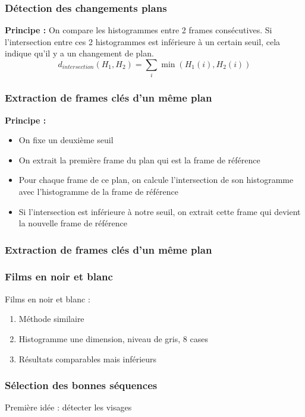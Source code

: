  \begin{frame}
 \frametitle{Détection des changements plans}
 
 \textbf{Principe :} On compare les histogrammes entre 2 frames consécutives. Si l'intersection entre ces 2 histogrammes est inférieure à un certain seuil, cela indique qu'il y a un changement de plan. \\
 \[d_{intersection}(H_{1},H_{2}) = \sum_{i} \min(H_{1}(i),H_{2}(i))\]
 
 \end{frame}
 
 
 \begin{frame}
 \frametitle{Extraction de frames clés d'un même plan}
 \textbf{Principe :}
\begin{itemize} 
\item{On fixe un deuxième seuil}
\item{On extrait la première frame du plan qui est la frame de référence}
\item{Pour chaque frame de ce plan, on calcule l'intersection de son histogramme avec l'histogramme de la frame de référence}
\item{Si l'intersection est inférieure à notre seuil, on extrait cette frame qui devient la nouvelle frame de référence}
\end{itemize}
\end{frame}

\begin{frame}
 \frametitle{Extraction de frames clés d'un même plan}
\end{frame}


\begin{frame}
 \frametitle{Films en noir et blanc}
 Films en noir et blanc :
 \begin{enumerate}
 \item Méthode similaire
 \item Histogramme une dimension, niveau de gris, 8 cases
 \item Résultats comparables mais inférieurs
 \end{enumerate}
 \end{frame}

\begin{frame}
\frametitle{Sélection des bonnes séquences}
Première idée : détecter les visages

\end{frame}

